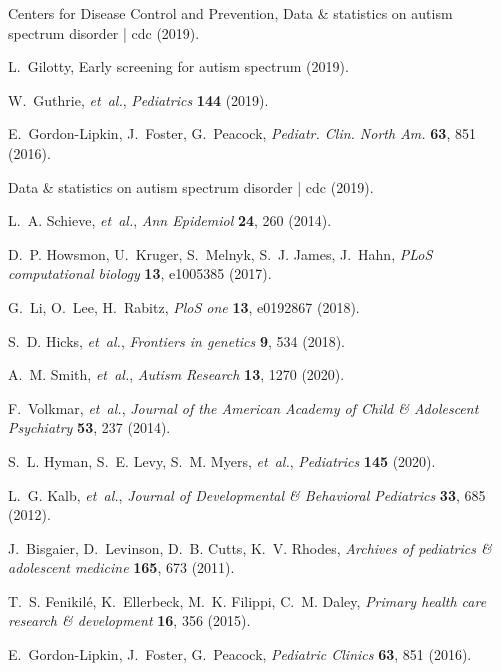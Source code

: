 \documentclass[onecolumn,,10pt]{IEEEtran}
\begin{document}
\begin{thebibliography}{10}

\textrm{Centers for Disease Control and Prevention}, Data \& statistics on
  autism spectrum disorder | cdc (2019).

L.~Gilotty, Early screening for autism spectrum (2019).

W.~Guthrie, {\it et~al.\/}, {\it Pediatrics\/} {\bf 144} (2019).

E.~Gordon-Lipkin, J.~Foster, G.~Peacock, {\it Pediatr. Clin. North Am.\/} {\bf
  63}, 851 (2016).

Data \& statistics on autism spectrum disorder | cdc (2019).

L.~A. Schieve, {\it et~al.\/}, {\it Ann Epidemiol\/} {\bf 24}, 260 (2014).

D.~P. Howsmon, U.~Kruger, S.~Melnyk, S.~J. James, J.~Hahn, {\it PLoS
  computational biology\/} {\bf 13}, e1005385 (2017).

G.~Li, O.~Lee, H.~Rabitz, {\it PloS one\/} {\bf 13}, e0192867 (2018).

S.~D. Hicks, {\it et~al.\/}, {\it Frontiers in genetics\/} {\bf 9}, 534 (2018).

A.~M. Smith, {\it et~al.\/}, {\it Autism Research\/} {\bf 13}, 1270 (2020).

F.~Volkmar, {\it et~al.\/}, {\it Journal of the American Academy of Child \&
  Adolescent Psychiatry\/} {\bf 53}, 237 (2014).

S.~L. Hyman, S.~E. Levy, S.~M. Myers, {\it et~al.\/}, {\it Pediatrics\/} {\bf
  145} (2020).

L.~G. Kalb, {\it et~al.\/}, {\it Journal of Developmental \& Behavioral
  Pediatrics\/} {\bf 33}, 685 (2012).

J.~Bisgaier, D.~Levinson, D.~B. Cutts, K.~V. Rhodes, {\it Archives of
  pediatrics \& adolescent medicine\/} {\bf 165}, 673 (2011).

T.~S. Fenikil{\'e}, K.~Ellerbeck, M.~K. Filippi, C.~M. Daley, {\it Primary
  health care research \& development\/} {\bf 16}, 356 (2015).

E.~Gordon-Lipkin, J.~Foster, G.~Peacock, {\it Pediatric Clinics\/} {\bf 63},
  851 (2016).


\end{thebibliography}
\end{document}
